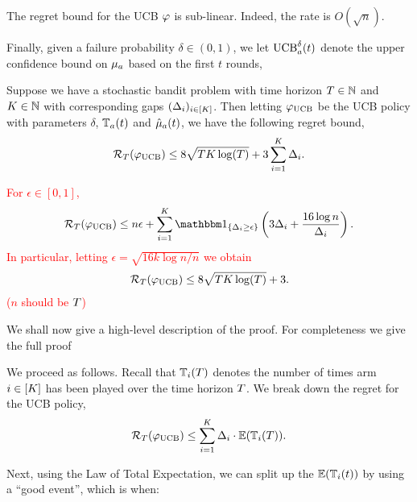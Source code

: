 
The regret bound for the UCB $\varphi$ is sub-linear. Indeed, the rate is $O(\sqrt{n})$. 

Finally, given a failure probability $\delta \in (0,1)$, we let $\mathrm{UCB}_{a}^{\delta}(t)$ denote the upper confidence bound on $\mu_{a}$ based on the first $t$ rounds,


\begin{theorem}\label{thm:ucbRegretBound}
Suppose we have a stochastic bandit problem with time horizon $T \in \mathbb{N}$ and $K \in \mathbb{N}$ with corresponding gaps $(\Delta_{i})_{i \in [K]}$. Then letting $\varphi_{\mathrm{UCB}}$ be the UCB policy with parameters $\delta$, $\mathbb{T}_{a}(t)$ and $\hat{\mu}_{a}(t)$, we have the following regret bound,
\begin{align*}
\mathcal{R}_{T}(\varphi_{\mathrm{UCB}}) \leq 8 \sqrt{T K \log(T)} + 3 \sum_{i=1}^{K} \Delta_{i}.
\end{align*}

\textcolor{red}{
For $\epsilon \in [0,1]$,
\begin{align*}
\cumulativeRegret{T}{\ucbPolicy} \leq n\epsilon + \sum_{i=1}^{\numArms}\one_{\{\Delta_i \geq \epsilon\}}\left(3 \gap{i}+\frac{16 \log n}{\Delta_i}\right).
\end{align*}
In particular, letting $\epsilon = \sqrt{16k \log n/n}$ we obtain 
\begin{align*}
\mathcal{R}_{T}(\varphi_{\mathrm{UCB}}) \leq 8 \sqrt{T K \log(T)} + 3.
\end{align*}
($n$ should be $T$)
}

\end{theorem}



We shall now give a high-level description of the proof. For completeness we give the full proof 

We proceed as follows. Recall that $\mathbb{T}_{i}(T)$ denotes the number of times arm $i \in [K]$ has been played over the time horizon $T$. We break down the regret for the UCB policy,
$$\mathcal{R}_{T}(\varphi_{\mathrm{UCB}}) \leq \sum_{i=1}^{K} \Delta_{i} \cdot \mathbb{E}(\mathbb{T}_{i}(T)).$$

Next, using the Law of Total Expectation, we can split up the $\mathbb{E}(\mathbb{T}_{i}(t))$ by using a ``good event'', which is when:

